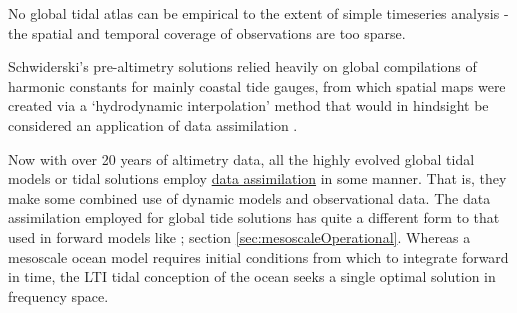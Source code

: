 No global tidal atlas can be empirical to the extent of simple timeseries analysis - the spatial and temporal coverage of observations are too sparse.

Schwiderski's pre-altimetry solutions relied heavily on global compilations of harmonic constants for mainly coastal tide gauges, from which spatial maps were created via a `hydrodynamic interpolation' method that would in hindsight be considered an application of data assimilation \cite[pp822]{Egbert:1994wz}.

Now with over 20 years of altimetry data, all the highly evolved global tidal models or tidal solutions employ \underline{data assimilation} in some manner.  That is, they make some combined use of dynamic models and observational data.  
The data assimilation employed for global tide solutions has quite a different form to that used in forward models like \BL{}; section \ref{sec:mesoscaleOperational}.  Whereas a mesoscale ocean model requires initial conditions from which to integrate forward in time, the LTI tidal conception of the ocean seeks a single optimal solution in frequency space. 


